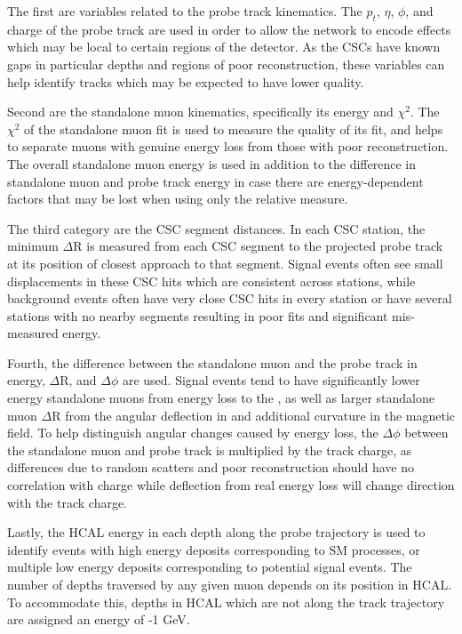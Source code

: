 The first are variables related to the probe track kinematics. 
The $p_t$, $\eta$, $\phi$, and charge of the probe track are used in order to allow the network to encode effects which may be local to certain regions of the detector.
As the CSCs have known gaps in particular depths and regions of poor reconstruction, these variables can help identify tracks which may be expected to have lower quality.

Second are the standalone muon kinematics, specifically its energy and $\chi^{2}$. %
The $\chi^{2}$ of the standalone muon fit is used to measure the quality of its fit, and helps to separate muons with genuine energy loss from those with poor reconstruction.
The overall standalone muon energy is used in addition to the difference in standalone muon and probe track energy in case there are energy-dependent factors that may be lost when using only the relative measure.


The third category are the CSC segment distances.
In each CSC station, the minimum $\Delta$R is measured from each CSC segment to the projected probe track at its position of closest approach to that segment.
Signal events often see small displacements in these CSC hits which are consistent across stations, while background events often have very close CSC hits in every station or have several stations with no nearby segments resulting in poor fits and significant mis-measured energy.

Fourth, the difference between the standalone muon and the probe track in energy, $\Delta$R, and $\Delta \phi$ are used.
Signal events tend to have significantly lower energy standalone muons from energy loss to the \aprime, as well as larger standalone muon $\Delta$R from the angular deflection in \dbrem and additional curvature in the magnetic field.
To help distinguish angular changes caused by energy loss, the $\Delta \phi$ between the standalone muon and probe track is multiplied by the track charge, as differences due to random scatters and poor reconstruction should have no correlation with charge while deflection from real energy loss will change direction with the track charge.

Lastly, the HCAL energy in each depth along the probe trajectory is used to identify events with high energy deposits corresponding to SM processes, or multiple low energy deposits corresponding to potential signal events.
The number of depths traversed by any given muon depends on its position in HCAL.
To accommodate this, depths in HCAL which are not along the track trajectory are assigned an energy of -1 GeV. 

